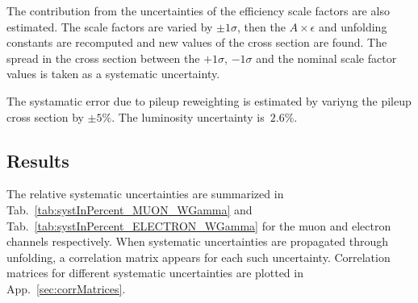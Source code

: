 
The contribution from the uncertainties of the efficiency scale factors are also estimated. The scale factors are varied by $\pm 1\sigma$, then the $A \times \epsilon$ and unfolding constants are recomputed and new values of the cross section are found. The spread in the cross section between the $+1\sigma$, $-1\sigma$ and the nominal scale factor values is taken as a systematic uncertainty.



The systamatic error due to pileup reweighting is estimated by variyng the pileup cross section by $\pm5\%$. The luminosity uncertainty is~$2.6\%$.

\subsection{Results}

The relative systematic uncertainties are summarized in Tab.~\ref{tab:systInPercent_MUON_WGamma} and Tab.~\ref{tab:systInPercent_ELECTRON_WGamma} for the muon and electron channels respectively. When systematic uncertainties are propagated through unfolding, a correlation matrix appears for each such uncertainty. Correlation matrices for different systematic uncertainties are plotted in App.~\ref{sec:corrMatrices}.


